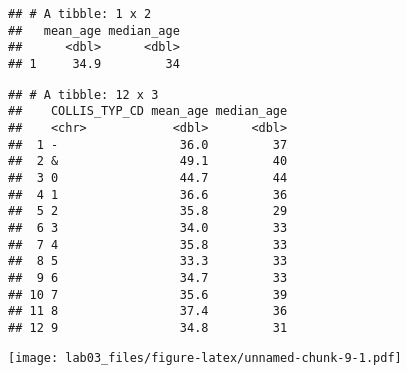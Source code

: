 \documentclass[]{article}
\newenvironment{Shaded}{\begin{snugshade}}{\end{snugshade}}
\newcommand{\KeywordTok}[1]{\textcolor[rgb]{0.13,0.29,0.53}{\textbf{#1}}}
\newcommand{\DataTypeTok}[1]{\textcolor[rgb]{0.13,0.29,0.53}{#1}}
\newcommand{\StringTok}[1]{\textcolor[rgb]{0.31,0.60,0.02}{#1}}
\newcommand{\CommentTok}[1]{\textcolor[rgb]{0.56,0.35,0.01}{\textit{#1}}}
\newcommand{\OperatorTok}[1]{\textcolor[rgb]{0.81,0.36,0.00}{\textbf{#1}}}
\newcommand{\NormalTok}[1]{#1}
\begin{document}
\begin{verbatim}
## # A tibble: 1 x 2
##   mean_age median_age
##      <dbl>      <dbl>
## 1     34.9         34
\end{verbatim}

\begin{Shaded}
\end{Shaded}

\begin{verbatim}
## # A tibble: 12 x 3
##    COLLIS_TYP_CD mean_age median_age
##    <chr>            <dbl>      <dbl>
##  1 -                 36.0         37
##  2 &                 49.1         40
##  3 0                 44.7         44
##  4 1                 36.6         36
##  5 2                 35.8         29
##  6 3                 34.0         33
##  7 4                 35.8         33
##  8 5                 33.3         33
##  9 6                 34.7         33
## 10 7                 35.6         39
## 11 8                 37.4         36
## 12 9                 34.8         31
\end{verbatim}

\begin{Shaded}
\end{Shaded}

\texttt{[image: lab03\_files/figure-latex/unnamed-chunk-9-1.pdf]}
\end{document}
